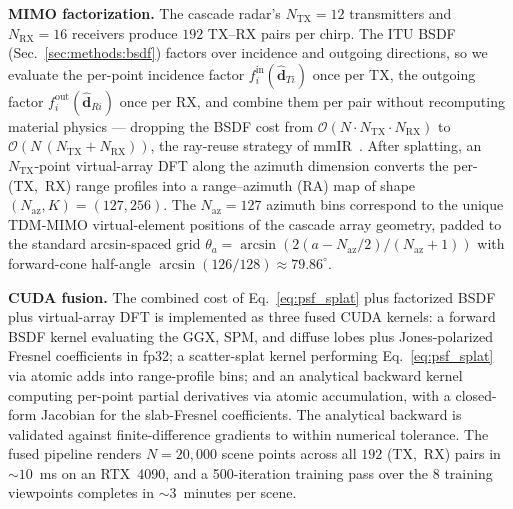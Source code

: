 \textbf{MIMO factorization.} The cascade radar's $N_{\text{TX}}{=}12$ transmitters and $N_{\text{RX}}{=}16$ receivers produce $192$ TX--RX pairs per chirp. The ITU BSDF (Sec.~\ref{sec:methods:bsdf}) factors over incidence and outgoing directions, so we evaluate the per-point incidence factor $f_i^{\text{in}}(\hat{\mathbf{d}}_{Ti})$ once per TX, the outgoing factor $f_i^{\text{out}}(\hat{\mathbf{d}}_{Ri})$ once per RX, and combine them per pair without recomputing material physics --- dropping the BSDF cost from $\mathcal{O}(N\!\cdot\!N_{\text{TX}}\!\cdot\!N_{\text{RX}})$ to $\mathcal{O}(N\,(N_{\text{TX}}{+}N_{\text{RX}}))$, the ray-reuse strategy of mmIR~\cite{mmIR2026,9533181}. After splatting, an $N_{\text{TX}}$-point virtual-array DFT along the azimuth dimension converts the per-(TX,~RX) range profiles into a range--azimuth (RA) map of shape $(N_{\text{az}},K) = (127, 256)$. The $N_{\text{az}}{=}127$ azimuth bins correspond to the unique TDM-MIMO virtual-element positions of the cascade array geometry, padded to the standard arcsin-spaced grid $\theta_a = \arcsin(2(a{-}N_{\text{az}}/2)/(N_{\text{az}}{+}1))$ with forward-cone half-angle $\arcsin(126/128) \approx 79.86^\circ$.

\textbf{CUDA fusion.} The combined cost of Eq.~\eqref{eq:psf_splat} plus factorized BSDF plus virtual-array DFT is implemented as three fused CUDA kernels: a forward BSDF kernel evaluating the GGX, SPM, and diffuse lobes plus Jones-polarized Fresnel coefficients in fp32; a scatter-splat kernel performing Eq.~\eqref{eq:psf_splat} via atomic adds into range-profile bins; and an analytical backward kernel computing per-point partial derivatives via atomic accumulation, with a closed-form Jacobian for the slab-Fresnel coefficients. The analytical backward is validated against finite-difference gradients to within numerical tolerance. The fused pipeline renders $N{=}20{,}000$ scene points across all $192$ (TX,~RX) pairs in ${\sim}10$~ms on an RTX~4090, and a 500-iteration training pass over the 8 training viewpoints completes in ${\sim}3$~minutes per scene.

